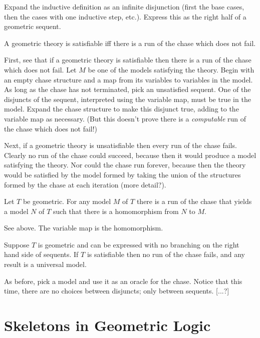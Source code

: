 \documentclass{article}
\begin{document}
Expand the inductive definition as an infinite disjunction (first the
base cases, then the cases with one inductive step, etc.). Express
this as the right half of a geometric sequent.

\begin{theorem}
A geometric theory is satisfiable iff there is a run of the chase
which does not fail.
\end{theorem}

First, see that if a geometric theory is satisfiable then there is a
run of the chase which does not fail. Let $M$ be one of the models
satisfying the theory. Begin with an empty chase structure and a map
from its variables to variables in the model. As long as the chase has
not terminated, pick an unsatisfied sequent. One of the disjuncts of
the sequent, interpreted using the variable map, must be true in the
model. Expand the chase structure to make this disjunct true, adding
to the variable map as necessary. (But this doesn't prove there is a
\emph{computable} run of the chase which does not fail!)

Next, if a geometric theory is unsatisfiable then every run of the
chase fails. Clearly no run of the chase could succeed, because then
it would produce a model satisfying the theory. Nor could the chase
run forever, because then the theory would be satisfied by the model
formed by taking the union of the structures formed by the chase at
each iteration (more detail?).

\begin{theorem}
Let $T$ be geometric.  For any model $M$ of $T$ there is a run of the
chase that yields a model $N$ of $T$ such that there is a homomorphism
from $N$ to $M$.
\end{theorem}

See above.  The variable map is the homomorphism.

\begin{theorem}
[?] Suppose $T$ is geometric and can be expressed with no branching on
the right hand side of sequents.  If $T$ is satisfiable then no run of
the chase fails, and any result is a universal model.
\end{theorem}

As before, pick a model and use it as an oracle for the chase. Notice
that this time, there are no choices between disjuncts; only between
sequents. [...?]


\section{Skeletons in Geometric Logic}
\end{document}
